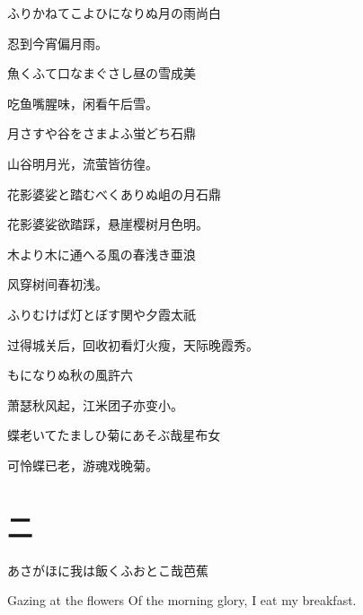 \begin{haiku}
    {\FH ふりかねてこよひになりぬ月の雨}\hfill{\FH 尚白}

    {\FK 忍到今宵偏月雨。}
\end{haiku}

\begin{haiku}
    {\FH 魚くふて口なまぐさし昼の雪}\hfill{\FH 成美}

    {\FK 吃鱼嘴腥味，闲看午后雪。}
\end{haiku}

\begin{haiku}
    {\FH 月さすや谷をさまよふ蛍どち}\hfill{\FH 石鼎}

    {\FK 山谷明月光，流萤皆彷徨。}
\end{haiku}

\begin{haiku}
    {\FH 花影婆娑と踏むべくありぬ岨の月}\hfill{\FH 石鼎}

    {\FK 花影婆娑欲踏踩，悬崖樱树月色明。}
\end{haiku}

\begin{haiku}
    {\FH 木より木に通へる風の春浅き}\hfill{\FH 亜浪}

    {\FK 风穿树间春初浅。}
\end{haiku}

\begin{haiku}
    {\FH ふりむけば灯とぼす関や夕霞}\hfill{\FH 太祇}

    {\FK 过得城关后，回收初看灯火瘦，天际晚霞秀。}
\end{haiku}

\begin{haiku}
    {\FH {}もになりぬ秋の風}\hfill{\FH 許六}

    {\FK 萧瑟秋风起，江米团子亦变小。}
\end{haiku}

\begin{haiku}
    {\FH 蝶老いてたましひ菊にあそぶ哉}\hfill{\FH 星布女}

    {\FK 可怜蝶已老，游魂戏晚菊。}
\end{haiku}

\chapter{\FK 二}
\setcounter{haikucounter}{0}

\begin{haiku}
    {\FH あさがほに我は飯くふおとこ哉}\hfill{\FH 芭蕉}

    \vin{} Gazing at the flowers
    \vin{} \vin{} Of the morning glory,
    \vin{} \vin{} \vin{} I eat my breakfast.
\end{haiku}

